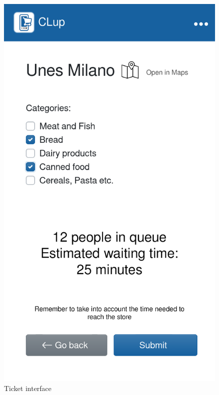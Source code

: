 \begin{figure}[H]
    \centering
    \includegraphics[scale=0.25]{Images/ticket-mockup.png}
    \caption{Ticket interface}
\end{figure}

